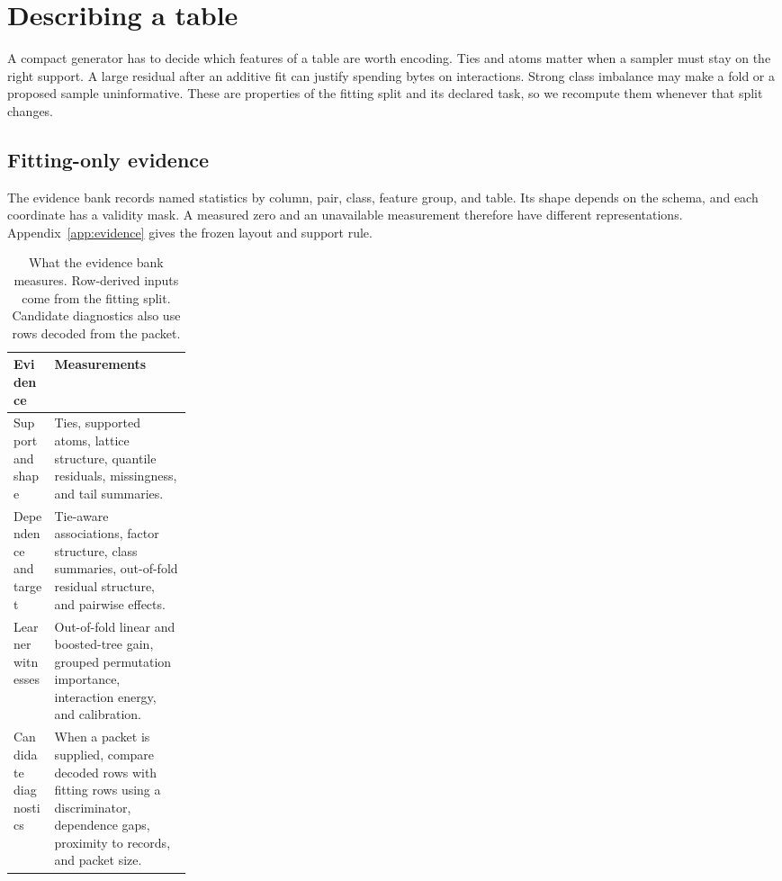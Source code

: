 \section{Describing a table}\label{sec:features}

A compact generator has to decide which features of a table are worth encoding. Ties and atoms matter when a sampler must stay on the right support. A large residual after an additive fit can justify spending bytes on interactions. Strong class imbalance may make a fold or a proposed sample uninformative. These are properties of the fitting split and its declared task, so we recompute them whenever that split changes.

\subsection{Fitting-only evidence}

The evidence bank records named statistics by column, pair, class, feature group, and table. Its shape depends on the schema, and each coordinate has a validity mask. A measured zero and an unavailable measurement therefore have different representations. Appendix~\ref{app:evidence} gives the frozen layout and support rule.

\begin{table}[!htbp]
  \centering
  \small
  \begin{tabularx}{\linewidth}{@{}p{0.23\linewidth}X@{}}
    \toprule
    Evidence & Measurements \\
    \midrule
    Support and shape & Ties, supported atoms, lattice structure, quantile residuals, missingness, and tail summaries. \\
    Dependence and target & Tie-aware associations, factor structure, class summaries, out-of-fold residual structure, and pairwise effects. \\
    Learner witnesses & Out-of-fold linear and boosted-tree gain, grouped permutation importance, interaction energy, and calibration. \\
    Candidate diagnostics & When a packet is supplied, compare decoded rows with fitting rows using a discriminator, dependence gaps, proximity to records, and packet size. \\
    \bottomrule
  \end{tabularx}
  \caption{What the evidence bank measures. Row-derived inputs come from the fitting split. Candidate diagnostics also use rows decoded from the packet.}
  \label{tab:evidence-families}
\end{table}

